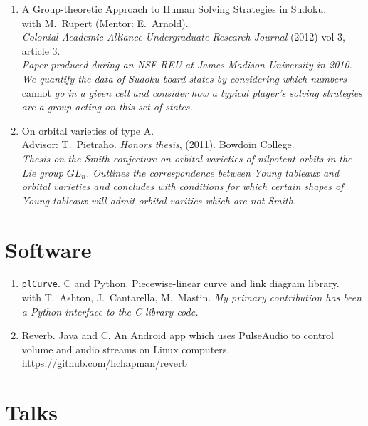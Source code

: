 \documentclass[letterpaper]{article}
\begin{document}
\begin{enumerate}
\item A Group-theoretic Approach to Human Solving Strategies in
  Sudoku.\\
  with M.\ Rupert (Mentor: E.\ Arnold). \\
  \textit{Colonial Academic
    Alliance
    Undergraduate Research Journal} (2012) vol 3, article 3.\\
  \textit{Paper produced during an NSF REU at James Madison University
    in 2010. We quantify the data of Sudoku board states by
    considering which numbers} cannot \textit{go in a given cell and
    consider how a typical player's solving strategies are a group
    acting on this set of states.}
\item On orbital varieties of type A. \\
  Advisor: T.\ Pietraho. \textit{Honors thesis}, (2011). Bowdoin
  College.\\
  \textit{Thesis on the Smith conjecture on orbital varieties of
    nilpotent orbits in the Lie group $GL_n$.  Outlines the
    correspondence between Young tableaux and orbital varieties and
    concludes with conditions for which certain shapes of Young
    tableaux will admit orbital varities which are not Smith.}
\end{enumerate}

\section*{Software}

\begin{enumerate}
\item \texttt{plCurve}. C and Python. Piecewise-linear curve and link diagram library.\\
  with T.\ Ashton, J.\ Cantarella, M.\ Mastin.
  \textit{My primary contribution has been a Python interface to the C
  library code.}
\item Reverb. Java and C. An Android app which uses PulseAudio to
  control volume and audio streams on Linux computers. \\
  \url{https://github.com/hchapman/reverb}
\end{enumerate}

\section*{Talks}
\end{document}
